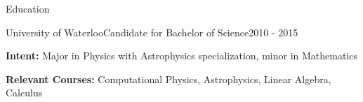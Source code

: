 \documentclass[oneside]{resume}
\begin{document}
  \begin{rSection}{Education}

    \begin{rEducation}{University of Waterloo}{Candidate for Bachelor of Science}{}{2010 - 2015}
      \item {\bfseries{Intent:}} Major in Physics with Astrophysics specialization, minor in Mathematics
      \item {\bfseries{Relevant Courses:}} Computational Physics, Astrophysics, Linear Algebra, Calculus
    \end{rEducation}

  \end{rSection}
\end{document}
